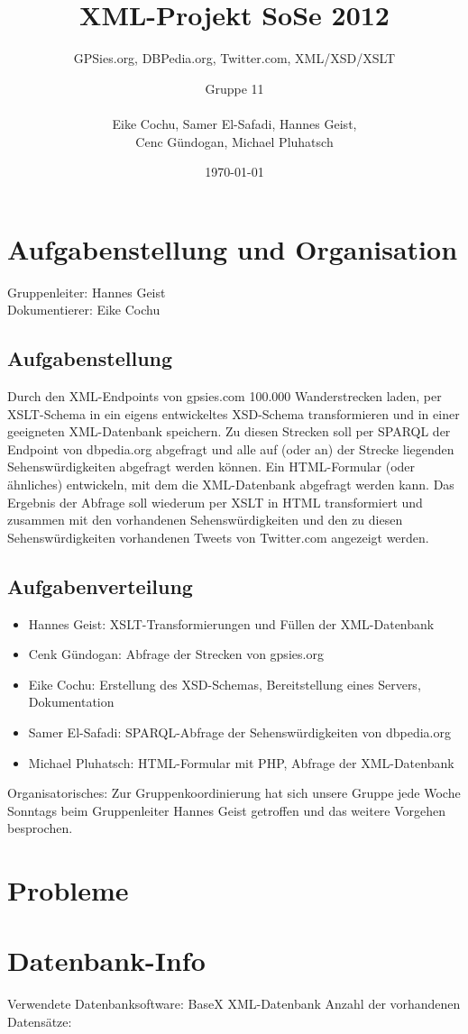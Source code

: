 \documentclass[10pt,a4paper]{scrartcl}
\title{XML-Projekt SoSe 2012}
\subtitle{GPSies.org, DBPedia.org, Twitter.com, XML/XSD/XSLT\vspace*{.7cm}}
\author{Gruppe 11\\\hfill\\Eike Cochu, Samer El-Safadi, Hannes Geist,\\Cenc Gündogan, Michael Pluhatsch}
\date{\today}
\begin{document}
\maketitle
\thispagestyle{empty}
\vspace*{2cm}
\tableofcontents
\newpage
\renewcommand{\baselinestretch}{1.5}
\selectfont

\section{Aufgabenstellung und Organisation}
Gruppenleiter: Hannes Geist\\
Dokumentierer: Eike Cochu

\subsection{Aufgabenstellung}
Durch den XML-Endpoints von gpsies.com 100.000 Wanderstrecken laden, per XSLT-Schema in ein eigens entwickeltes XSD-Schema transformieren und in einer geeigneten XML-Datenbank speichern. Zu diesen Strecken soll per SPARQL der Endpoint von dbpedia.org abgefragt und alle auf (oder an) der Strecke liegenden Sehenswürdigkeiten abgefragt werden können. Ein HTML-Formular (oder ähnliches) entwickeln, mit dem die XML-Datenbank abgefragt werden kann. Das Ergebnis der Abfrage soll wiederum per XSLT in HTML transformiert und zusammen mit den vorhandenen Sehenswürdigkeiten und den zu diesen Sehenswürdigkeiten vorhandenen Tweets von Twitter.com angezeigt werden.

\subsection{Aufgabenverteilung}
\begin{itemize}
\item Hannes Geist: XSLT-Transformierungen und Füllen der XML-Datenbank
\item Cenk Gündogan: Abfrage der Strecken von gpsies.org 
\item Eike Cochu: Erstellung des XSD-Schemas, Bereitstellung eines Servers, Dokumentation
\item Samer El-Safadi: SPARQL-Abfrage der Sehenswürdigkeiten von dbpedia.org
\item Michael Pluhatsch: HTML-Formular mit PHP, Abfrage der XML-Datenbank
\end{itemize}

Organisatorisches: Zur Gruppenkoordinierung hat sich unsere Gruppe jede Woche Sonntags beim Gruppenleiter Hannes Geist getroffen und das weitere Vorgehen besprochen.

\section{Probleme}

\section{Datenbank-Info}
Verwendete Datenbanksoftware: BaseX XML-Datenbank
Anzahl der vorhandenen Datensätze:
\end{document}

